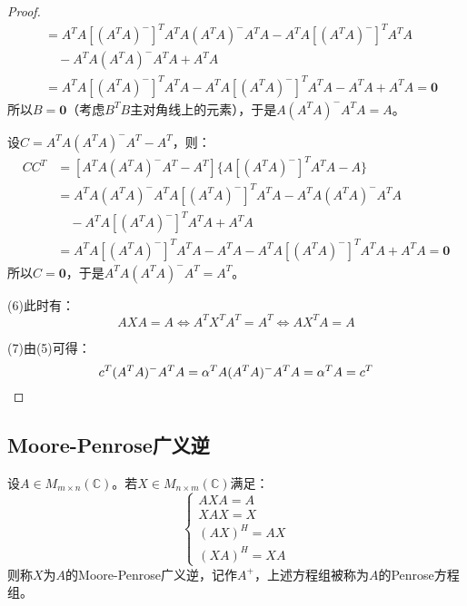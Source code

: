 \begin{proof}
\begin{align*}
		&=A^TA[(A^TA)^-]^TA^TA(A^TA)^-A^TA-A^TA[(A^TA)^-]^TA^TA \\
		&\quad-A^TA(A^TA)^-A^TA+A^TA \\
		&=A^TA[(A^TA)^-]^TA^TA-A^TA[(A^TA)^-]^TA^TA-A^TA+A^TA=\mathbf{0}
	\end{align*}
	所以$B=\mathbf{0}$（考虑$B^TB$主对角线上的元素），于是$A(A^TA)^-A^TA=A$。\par
	设$C=A^TA(A^TA)^-A^T-A^T$，则：
	\begin{align*}
		CC^T
		&=[A^TA(A^TA)^-A^T-A^T]\{A[(A^TA)^-]^TA^TA-A\} \\
		&=A^TA(A^TA)^-A^TA[(A^TA)^-]^TA^TA-A^TA(A^TA)^-A^TA \\
		&\quad-A^TA[(A^TA)^-]^TA^TA+A^TA \\
		&=A^TA[(A^TA)^-]^TA^TA-A^TA-A^TA[(A^TA)^-]^TA^TA+A^TA=\mathbf{0}
	\end{align*}
	所以$C=\mathbf{0}$，于是$A^TA(A^TA)^-A^T=A^T$。\par
	(6)此时有：
	\begin{equation*}
		AXA=A\iff A^TX^TA^T=A^T\iff AX^TA=A
	\end{equation*}\par
	(7)由(5)可得：
	\begin{equation*}
		c^T(A^TA)^-A^TA=\alpha^TA(A^TA)^-A^TA=\alpha^TA=c^T\qedhere
	\end{equation*}
\end{proof}

\subsection{Moore-Penrose广义逆}
\begin{definition}
	设$A\in M_{m\times n}(\mathbb{C})$。若$X\in M_{n\times m}(\mathbb{C})$满足：
	\begin{equation*}
		\begin{cases}
			AXA=A \\
			XAX=X \\
			(AX)^H=AX \\
			(XA)^H=XA
		\end{cases}
	\end{equation*}
	则称$X$为$A$的Moore-Penrose广义逆，记作$A^+$，上述方程组被称为$A$的Penrose方程组。
\end{definition}
